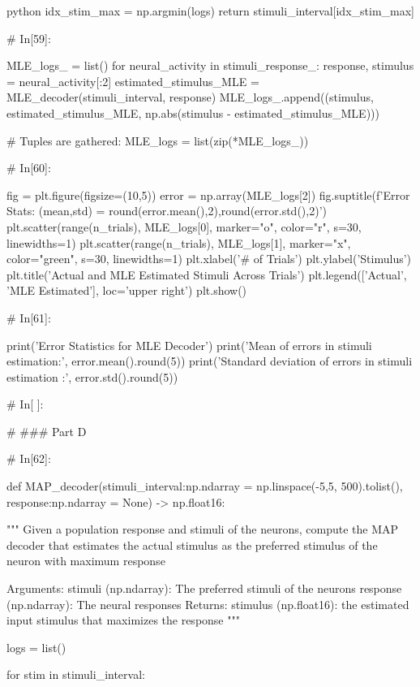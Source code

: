\documentclass[12pt]{amsart}
\begin{document}
\begin{mintedbox}{python}
    idx_stim_max = np.argmin(logs)
    return stimuli_interval[idx_stim_max]
        


# In[59]:


MLE_logs_ = list()
for neural_activity in stimuli_response_:
    response, stimulus = neural_activity[:2]
    estimated_stimulus_MLE = MLE_decoder(stimuli_interval, response)
    MLE_logs_.append((stimulus, estimated_stimulus_MLE, np.abs(stimulus - estimated_stimulus_MLE)))
    
            
# Tuples are gathered:
MLE_logs = list(zip(*MLE_logs_))


# In[60]:


fig = plt.figure(figsize=(10,5))
error = np.array(MLE_logs[2])
fig.suptitle(f'Error Stats: (mean,std) = {round(error.mean(),2),round(error.std(),2)}')
plt.scatter(range(n_trials), MLE_logs[0], marker="o", color="r", s=30, linewidths=1)
plt.scatter(range(n_trials), MLE_logs[1], marker="x", color="green", s=30, linewidths=1)
plt.xlabel('# of Trials')
plt.ylabel('Stimulus')
plt.title('Actual and MLE Estimated Stimuli Across Trials')
plt.legend(['Actual', 'MLE Estimated'], loc='upper right')
plt.show()


# In[61]:


print('Error Statistics for MLE Decoder')
print('Mean of errors in stimuli estimation:', error.mean().round(5))
print('Standard deviation of errors in stimuli estimation :', error.std().round(5))


# In[ ]:





# ### Part D

# In[62]:


def MAP_decoder(stimuli_interval:np.ndarray = np.linspace(-5,5, 500).tolist(),
                response:np.ndarray = None) -> np.float16:
     
    """
    Given a population response and  stimuli of the
    neurons, compute the MAP decoder that 
    estimates the actual stimulus as the preferred
    stimulus of the neuron with maximum response

        Arguments:
            stimuli  (np.ndarray): The preferred stimuli of the neurons
            response (np.ndarray): The neural responses
        Returns:
            stimulus (np.float16): the estimated input stimulus that maximizes the response
    """


    logs = list()

    for stim in stimuli_interval:


\end{mintedbox}
\end{document}
